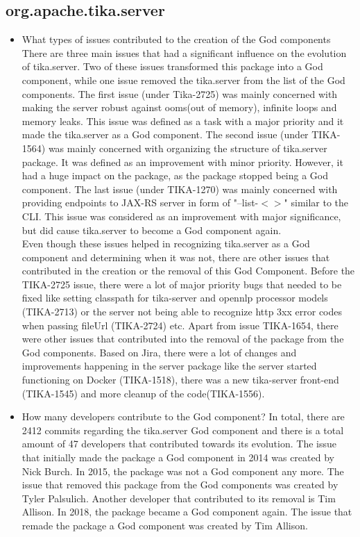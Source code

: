 \documentclass{article}
\begin{document}
\subsection{org.apache.tika.server}
\begin{itemize}
    \item What types of issues contributed to the creation of the God components\\
    There are three main issues that had a significant influence on the evolution of tika.server. Two of these issues transformed this package into a God component, while one issue removed the tika.server from the list of the God components. The first issue (under Tika-2725) was mainly concerned with making the server robust against ooms(out of memory), infinite loops and memory leaks. This issue was defined as a task with a major priority and it made the tika.server as a God component. The second issue (under TIKA-1564) was mainly concerned with organizing the structure of tika.server package. It was defined as an improvement with minor priority. However, it had a huge impact on the package, as the package stopped being a God component. The last issue (under TIKA-1270) was mainly concerned with providing endpoints to JAX-RS server in form of "--list-$<>$" similar to the CLI. This issue was considered as an improvement with major significance, but did cause tika.server to become a God component again.\\
    Even though these issues helped in recognizing tika.server as a God component and determining when it was not, there are other issues that contributed in the creation or the removal of this God Component. Before the TIKA-2725 issue, there were a lot of major priority bugs that needed to be fixed like setting classpath for tika-server and opennlp processor models (TIKA-2713) or the server not being able to recognize http 3xx error codes when passing fileUrl (TIKA-2724) etc. Apart from issue TIKA-1654, there were other issues that contributed into the removal of the package from the God components. Based on Jira, there were a lot of changes and improvements happening in the server package like the server started functioning on Docker (TIKA-1518), there was a new tika-server front-end (TIKA-1545) and more cleanup of the code(TIKA-1556).
    \item How many developers contribute to the God component?
    In total, there are 2412 commits regarding the tika.server God component and there is a total amount of 47 developers that contributed towards its evolution. The issue that initially made the package a God component in 2014 was created by Nick Burch. %
    In 2015, the package was not a God component any more. The issue that removed this package from the God components was created by Tyler Palsulich. Another developer that contributed to its removal is Tim Allison. In 2018, the package became a God component again. The issue that remade the package a God component was created by Tim Allison. %



\end{itemize}
\end{document}
